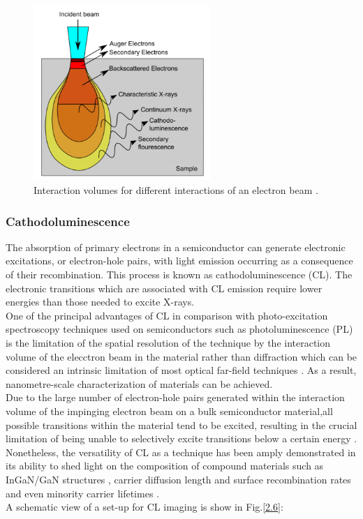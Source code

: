 \begin{figure}[h]
	\centering
	\includegraphics[width=0.6\textwidth]{Figs/Ch2/int.png}
	\caption {Interaction volumes for different interactions of an electron beam \cite{Puchtler2014}.}
	\label{2.5}
\end{figure}
\FloatBarrier



\subsubsection{Cathodoluminescence}

The absorption of primary electrons in a semiconductor can generate electronic excitations, or electron-hole pairs, with light emission occurring as a consequence of their recombination. This process is known as cathodoluminescence (CL). The electronic transitions which are associated with CL emission require lower energies than those needed to excite X-rays.\\
\indent One of the principal advantages of CL in comparison with photo-excitation spectroscopy techniques used on semiconductors such as photoluminescence  (PL) is the limitation of the spatial resolution of the technique by the interaction volume of the elecctron beam in the material rather than diffraction which can be considered an intrinsic limitation of most optical far-field techniques \cite{Edwards2011}. As a result, nanometre-scale characterization of materials can be achieved.\\
\indent Due to the large number of electron-hole pairs generated within the interaction volume of the impinging electron beam on a bulk semiconductor material,all possible transitions within the material tend to be excited, resulting in the crucial limitation of being unable to selectively excite transitions below a certain energy \cite{Edwards2011}. Nonetheless, the versatility of CL as a technique has been amply demonstrated in its ability to shed light on the composition of compound materials such as InGaN/GaN structures \cite{Martin2004}, carrier diffusion length and surface recombination rates \cite{Sercel1989} and even minority carrier lifetimes \cite{YacobiHolt1990}.\\
\indent A schematic view of a set-up for CL imaging is show in Fig.\ref{2.6}:

